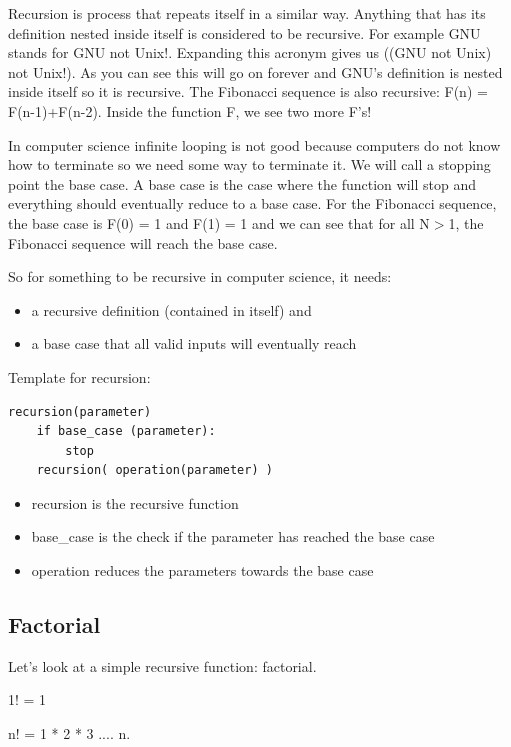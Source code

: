 \documentclass[11pt,oneside]{book}
\begin{document}
Recursion is process that repeats itself in a similar way. Anything that has its definition nested inside itself is considered to be recursive. For example GNU stands for GNU not Unix!. Expanding this acronym gives us ((GNU not Unix) not Unix!). As you can see this will go on forever and GNU's definition is nested inside itself so it is recursive. The Fibonacci sequence is also recursive: F(n) = F(n-1)+F(n-2). Inside the function F, we see two more F's!

In computer science infinite looping is not good because computers do not know how to terminate so we need some way to terminate it. We will call a stopping point the base case. A base case is the case where the function will stop and everything should eventually reduce to a base case. For the Fibonacci sequence, the base case is F(0) = 1 and F(1) = 1 and we can see that for all N$>$1, the Fibonacci sequence will reach the base case.

So for something to be recursive in computer science, it needs:

\begin{itemize}
\item a recursive definition (contained in itself) and 
\item a base case that all valid inputs will eventually reach
\end{itemize}

Template for recursion:

\begin{lstlisting}
recursion(parameter)
    if base_case (parameter):
        stop
    recursion( operation(parameter) )
\end{lstlisting}

\begin{itemize}
\item recursion is the recursive function
\item base\_case is the check if the parameter has reached the base case
\item operation reduces the parameters towards the base case
\end{itemize}

\subsection{Factorial}

Let's look at a simple recursive function: factorial.

1! = 1

n! = 1 * 2 * 3 .... n.
\end{document}

